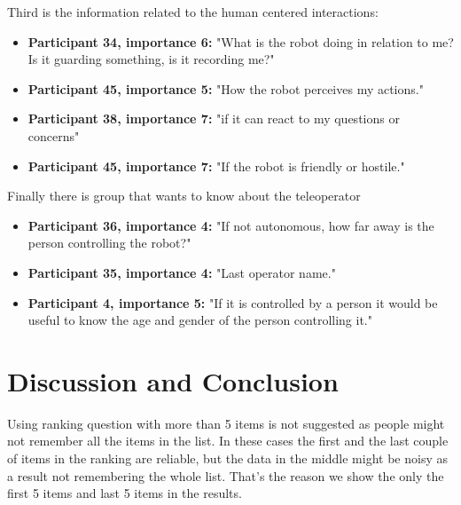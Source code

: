 \documentclass[letterpaper, 10 pt, conference]{ieeeconf}  %
\begin{document}
Third is the information related to the human centered interactions:
\begin{itemize}
    \item  \textbf{Participant 34, importance 6:} "What is the robot doing in relation to me? Is it guarding something, is it recording me?"
    \item  \textbf{Participant 45, importance 5:} "How the robot perceives my actions."
    \item  \textbf{Participant 38, importance 7:} "if it can react to my questions or concerns"
    \item  \textbf{Participant 45, importance 7:} "If the robot is friendly or hostile."
\end{itemize}

Finally there is group that wants to know about the teleoperator
\begin{itemize}
    \item  \textbf{Participant 36, importance 4:} "If not autonomous, how far away is the person controlling the robot?"
    \item  \textbf{Participant 35, importance 4:} "Last operator name."
    \item  \textbf{Participant 4, importance 5:} "If it is controlled by a person it would be useful to know the age and gender of the person controlling it."
\end{itemize}































\section{Discussion and Conclusion}


 Using ranking question with more than 5 items is not suggested as people might not remember all the items in the list. In these cases the first and the last couple of items in the ranking are reliable, but the data in the middle might be noisy as a result not remembering the whole list. That's the reason we show the only the first 5 items and last 5 items in the results.
\end{document}
